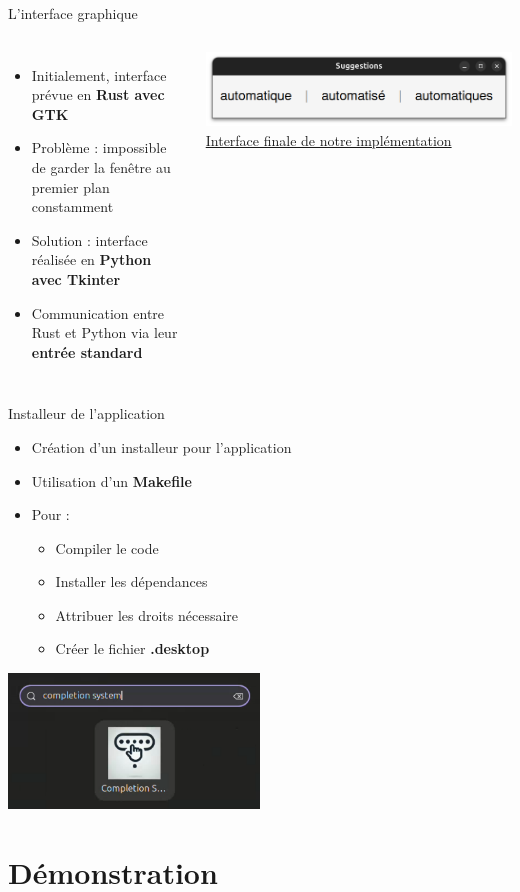 \begin{frame}{L'interface graphique}
	\begin{columns}
		\begin{itemize}
			\item Initialement, interface prévue en \textbf{Rust avec GTK}
			\item Problème : impossible de garder la fenêtre au premier plan constamment
			\item Solution : interface réalisée en \textbf{Python avec Tkinter}
			\item Communication entre Rust et Python via leur \textbf{entrée standard}
		\end{itemize}

		\centering
		\includegraphics[width=\textwidth]{images/demo_interface.png}
		\uline{Interface finale de notre implémentation}
	\end{columns}
\end{frame}


\begin{frame}{Installeur de l'application}
	\begin{itemize}
		\item Création d'un installeur pour l'application
		\item Utilisation d'un \textbf{Makefile}
		\item Pour :
		      \begin{itemize}
			      \item Compiler le code
			      \item Installer les dépendances
			      \item Attribuer les droits nécessaire
			      \item Créer le fichier \textbf{.desktop}
		      \end{itemize}
	\end{itemize}
	\begin{center}
		\includegraphics[width=0.5\textwidth]{images/application.png}
	\end{center}

\end{frame}

\section{Démonstration}%

